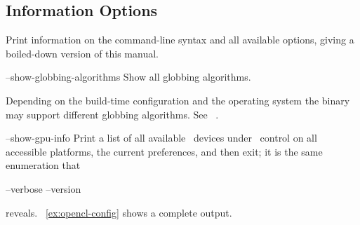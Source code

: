 

\subsection[Information Options\commonpart]{\label{sec:information-options}%
  Information Options\commonpart}

\begin{codelist}
  \label{opt:help}%
\item[\itempar{-h \\ --help}]\itemend
  Print information on the command-line syntax and all available options, giving a
  boiled-down version of this manual.


  \label{opt:show-globbing-algorithms}%
\item[--show-globbing-algorithms]\itemend
  Show all globbing
  algorithms.

  Depending on the build-time configuration and the operating system the binary may support
  different globbing algorithms.  See \sectionName~.


  \label{opt:show-gpu-info}%
\item[--show-gpu-info \restrictednote{\acronym{OpenCL}-enabled versions only.}]\itemend
  Print a list of all available ~devices under
  ~control on all accessible platforms, the
  current preferences, and then exit; it is the same enumeration that
  \begin{literal}
    \app{} --verbose --version
  \end{literal}
  reveals.%
  \exampleName~\ref{ex:opencl-config} shows a complete output.


\end{codelist}
